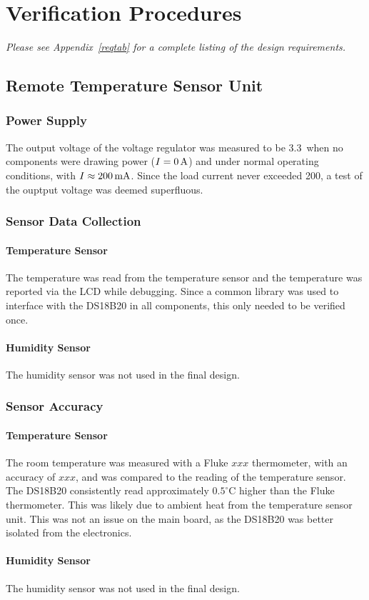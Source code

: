 \section{Verification Procedures}
\emph{Please see Appendix~\ref{reqtab} for a complete listing of the design requirements.}
\subsection{Remote Temperature Sensor Unit}
\subsubsection{Power Supply}
The output voltage of the voltage regulator was measured to be 3.3\volts\ when no components were drawing power ($I=0\mbox{\,A}$) and under normal operating conditions, with $I\approx200\mbox{\,mA}$.  Since the load current never exceeded 200\mamps, a test of the ouptput voltage was deemed superfluous.

\subsubsection{Sensor Data Collection}
\paragraph{Temperature Sensor}
The temperature was read from the temperature sensor and the temperature was reported via the LCD while debugging.  Since a common library was used to interface with the DS18B20 in all components, this only needed to be verified once.

\paragraph{Humidity Sensor}
The humidity sensor was not used in the final design.

\subsubsection{Sensor Accuracy}
\paragraph{Temperature Sensor}
The room temperature was measured with a Fluke $xxx$ thermometer, with an accuracy of $xxx$, and was compared to the reading of the temperature sensor.  The DS18B20 consistently read approximately $0.5^\circ$C higher than the Fluke thermometer.  This was likely due to ambient heat from the temperature sensor unit.  This was not an issue on the main board, as the DS18B20 was better isolated from the electronics.

\paragraph{Humidity Sensor}
The humidity sensor was not used in the final design.


